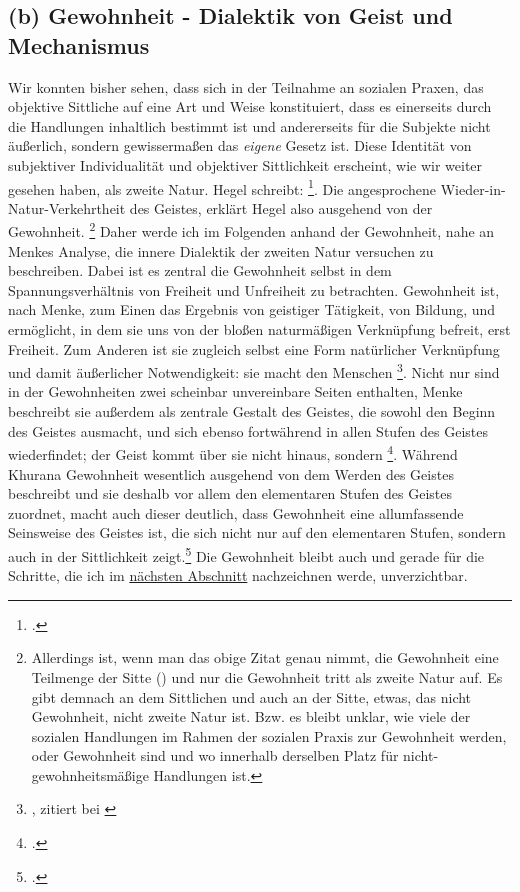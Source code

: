 \documentclass[12pt, a4paper, openany]{report}
\begin{document}
\subsection{(b) Gewohnheit - Dialektik von Geist und Mechanismus}
Wir konnten bisher sehen, dass sich in der Teilnahme an sozialen Praxen, das objektive Sittliche auf eine Art und Weise konstituiert, dass es einerseits durch die Handlungen inhaltlich bestimmt ist und andererseits für die Subjekte nicht äußerlich, sondern gewissermaßen das \emph{eigene} Gesetz ist. 
Diese Identität von subjektiver Individualität und objektiver Sittlichkeit erscheint, wie wir weiter gesehen haben, als zweite Natur.
Hegel schreibt: \footcite[][§ 151, S. 166]{hegel_grundlinien_2017}.
Die angesprochene Wieder-in-Natur-Verkehrtheit des Geistes, erklärt Hegel also ausgehend von der Gewohnheit.%
\footnote{
    Allerdings ist, wenn man das obige Zitat genau nimmt, die Gewohnheit eine Teilmenge der Sitte () und nur die Gewohnheit tritt als zweite Natur auf.
    Es gibt demnach an dem Sittlichen und auch an der Sitte, etwas, das nicht Gewohnheit, nicht zweite Natur ist. 
    Bzw. es bleibt unklar, wie viele der sozialen Handlungen im Rahmen der sozialen Praxis zur Gewohnheit werden, oder Gewohnheit sind und wo innerhalb derselben Platz für nicht-gewohnheitsmäßige Handlungen ist. 
}
Daher werde ich im Folgenden anhand der Gewohnheit, nahe an Menkes Analyse, die innere Dialektik der zweiten Natur versuchen zu beschreiben.
Dabei ist es zentral die Gewohnheit selbst in dem Spannungsverhältnis von Freiheit und Unfreiheit zu betrachten. 
Gewohnheit ist, nach Menke, zum Einen das Ergebnis von geistiger Tätigkeit, von Bildung, und ermöglicht, in dem sie uns von der bloßen naturmäßigen Verknüpfung befreit, erst Freiheit.
Zum Anderen ist sie zugleich selbst eine Form natürlicher Verknüpfung und damit äußerlicher Notwendigkeit: sie macht den Menschen \footnote{, zitiert bei \cite[][127]{menke_autonomie_2018}}.
Nicht nur sind in der Gewohnheiten zwei scheinbar unvereinbare Seiten enthalten, Menke beschreibt sie außerdem als zentrale Gestalt des Geistes, die sowohl den Beginn des Geistes ausmacht, und sich ebenso fortwährend in allen Stufen des Geistes wiederfindet; 
der Geist kommt über sie nicht hinaus, sondern \footcite[][129]{menke_autonomie_2018}.
Während Khurana Gewohnheit wesentlich ausgehend von dem Werden des Geistes beschreibt und sie deshalb vor allem den elementaren Stufen des Geistes zuordnet, macht auch dieser deutlich, dass Gewohnheit eine allumfassende Seinsweise des Geistes ist, die sich nicht nur auf den elementaren Stufen, sondern auch in der Sittlichkeit zeigt.\footcite[Vgl.][433]{khurana_freiheit_2017}
Die Gewohnheit bleibt auch und gerade für die Schritte, die ich im \hyperref[kritik_affirmation]{nächsten Abschnitt} nachzeichnen werde, unverzichtbar.\\
\end{document}
